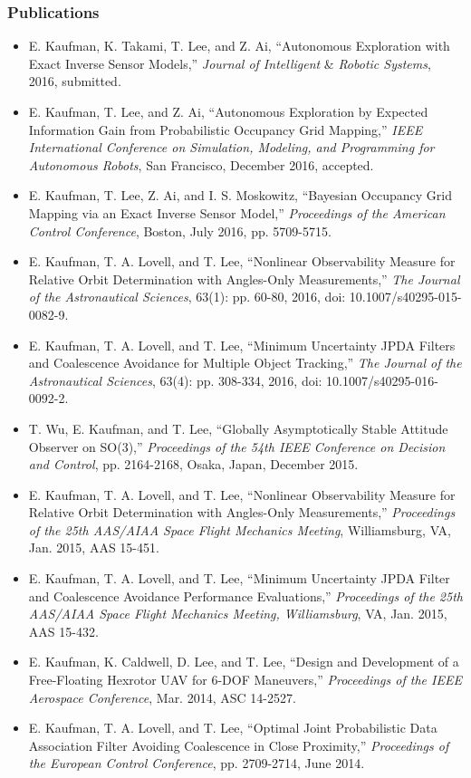 \documentclass[11pt,professionalfonts,hyperref={pdftex,pdfpagemode=none,pdfstartview=FitH}]{beamer}
\begin{document}
\begin{frame}
\frametitle{Publications}
{\tiny 
\begin{itemize}
	\item E. Kaufman, K. Takami, T. Lee, and Z. Ai, ``Autonomous Exploration with Exact Inverse Sensor Models,'' \textit{Journal of Intelligent }\&\textit{ Robotic Systems}, 2016, submitted.
	\item E. Kaufman, T. Lee, and Z. Ai, ``Autonomous Exploration by Expected Information Gain from Probabilistic Occupancy Grid Mapping,'' \textit{IEEE International Conference on Simulation, Modeling, and Programming for Autonomous Robots}, San Francisco, December 2016, accepted.
	\item E. Kaufman, T. Lee, Z. Ai, and I. S. Moskowitz, ``Bayesian Occupancy Grid Mapping via an Exact Inverse Sensor Model,'' \textit{Proceedings of the American Control Conference}, Boston, July 2016, pp. 5709-5715.
	\item E. Kaufman, T. A. Lovell, and T. Lee, ``Nonlinear Observability Measure for Relative Orbit Determination with Angles-Only Measurements,'' \textit{The Journal of the Astronautical Sciences}, 63(1): pp. 60-80, 2016, doi: 10.1007/s40295-015-0082-9.
	\item E. Kaufman, T. A. Lovell, and T. Lee, ``Minimum Uncertainty JPDA Filters and Coalescence Avoidance for Multiple Object Tracking,'' \textit{The Journal of the Astronautical Sciences}, 63(4): pp. 308-334, 2016, doi: 10.1007/s40295-016-0092-2.
	\item T. Wu, E. Kaufman, and T. Lee, ``Globally Asymptotically Stable Attitude Observer on SO(3),'' \textit{Proceedings of the 54th IEEE Conference on Decision and Control}, pp. 2164-2168, Osaka, Japan, December 2015.
	\item E. Kaufman, T. A. Lovell, and T. Lee, ``Nonlinear Observability Measure for Relative Orbit Determination with Angles-Only Measurements,'' \textit{Proceedings of the 25th AAS/AIAA Space Flight Mechanics Meeting}, Williamsburg, VA, Jan. 2015, AAS 15-451.
	\item E. Kaufman, T. A. Lovell, and T. Lee, ``Minimum Uncertainty JPDA Filter and Coalescence Avoidance Performance Evaluations,'' \textit{Proceedings of the 25th AAS/AIAA Space Flight Mechanics Meeting, Williamsburg}, VA, Jan. 2015, AAS 15-432.
	\item E. Kaufman, K. Caldwell, D. Lee, and T. Lee, ``Design and Development of a Free-Floating Hexrotor UAV for 6-DOF Maneuvers,'' \textit{Proceedings of the IEEE Aerospace Conference}, Mar. 2014, ASC 14-2527.
	\item E. Kaufman, T. A. Lovell, and T. Lee, ``Optimal Joint Probabilistic Data Association Filter Avoiding Coalescence in Close Proximity,'' \textit{Proceedings of the European Control Conference}, pp. 2709-2714, June 2014.
	\vspace*{0.5cm}
\end{itemize}
}
\end{frame}
\end{document}
